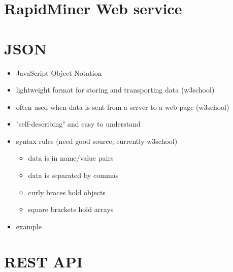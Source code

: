 
\section{RapidMiner Web service}


\section{JSON}

\begin{itemize}
	\item JavaScript Object Notation
	\item lightweight format for storing and transporting data (w3school)
	\item often used when data is sent from a server to a web page (w3school)
	\item "self-describing" and easy to understand
	\item syntax rules (need good source, currently w3school)
	\begin{itemize}
		\item data is in name/value pairs
		\item data is separated by commas
		\item curly braces hold objects
		\item square brackets hold arrays
	\end{itemize}
	\item example
\end{itemize}


\section{REST API}
